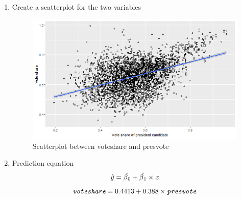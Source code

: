 \documentclass[12pt,letterpaper]{article}
\begin{document}
\begin{enumerate}
		\item Create a scatterplot for the two variables
			
			\begin{figure}[H]\centering
				\caption{\footnotesize Scatterplot between voteshare and presvote}
				\label{fig:plot_1}
				\includegraphics[width=.85\textwidth]{3.2. Scatter_plot_voteshare_presvote.png}
			\end{figure}
		
		\item Prediction equation
		$$\hat{y} = \hat{\beta\textsubscript{0}} + \hat{\beta\textsubscript{1}} \times \textit{x} $$
		$$ \textit{\texttt{voteshare}} = 0.4413 + 0.388 \times \textit{\texttt{presvote}}$$
	\end{enumerate}
\end{document}
